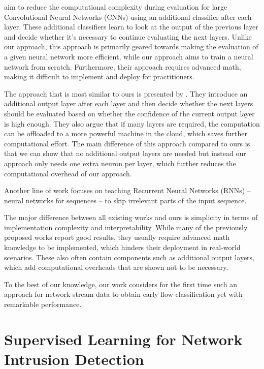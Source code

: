 \documentclass[conference]{IEEEtran}
\begin{document}
\cite{bolukbasi_adaptive_2017} aim to reduce the computational complexity during evaluation for large Convolutional Neural Networks (CNNs) using an additional classifier after each layer. These additional classifiers learn to look at the output of the previous layer and decide whether it's necessary to continue evaluating the next layers. Unlike our approach, this approach is primarily geared towards making the evaluation of a given neural network more efficient, while our approach aims to train a neural network from scratch. Furthermore, their approach requires advanced math, making it difficult to implement and deploy for practitioners.

The approach that is most similar to ours is presented by \cite{leroux_resource-constrained_2015,leroux_cascading_2017}. They introduce an additional output layer after each layer and then decide whether the next layers should be evaluated based on whether the confidence of the current output layer is high enough. They also argue that if many layers are required, the computation can be offloaded to a more powerful machine in the cloud, which saves further computational effort. The main difference of this approach compared to ours is that we can show that no additional output layers are needed but instead our approach only needs one extra neuron per layer, which further reduces the computational overhead of our approach.

Another line of work \cite{seo_neural_2018,yu_learning_2017, graves_adaptive_2017, bachl_sparseids_2020} focuses on teaching Recurrent Neural Networks (RNNs) -- neural networks for sequences -- to skip irrelevant parts of the input sequence.

The major difference between all existing works and ours is simplicity in terms of implementation complexity and interpretability. While many of the previously proposed works report good results, they usually require advanced math knowledge to be implemented, which hinders their deployment in real-world scenarios. These also often contain components such as additional output layers, which add computational overheads that are shown not to be necessary.

To the best of our knowledge, our work considers for the first time such an approach for network stream data to obtain early flow classification yet with remarkable performance.

\section{Supervised Learning for Network Intrusion Detection}
\end{document}
